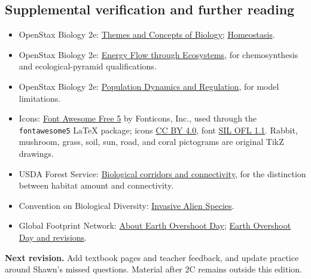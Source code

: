 \documentclass[11pt,letterpaper]{article}
\begin{document}
\subsection*{Supplemental verification and further reading}
\begin{itemize}
\item OpenStax Biology 2e: \href{https://openstax.org/books/biology-2e/pages/1-2-themes-and-concepts-of-biology}{Themes and Concepts of Biology}; \href{https://openstax.org/books/biology-2e/pages/33-3-homeostasis}{Homeostasis}.
\item OpenStax Biology 2e: \href{https://openstax.org/books/biology-2e/pages/46-2-energy-flow-through-ecosystems}{Energy Flow through Ecosystems}, for chemosynthesis and ecological-pyramid qualifications.
\item OpenStax Biology 2e: \href{https://openstax.org/books/biology-2e/pages/45-4-population-dynamics-and-regulation}{Population Dynamics and Regulation}, for model limitations.
\item Icons: \href{https://fontawesome.com/}{Font Awesome Free 5} by Fonticons, Inc., used through the \texttt{fontawesome5} LaTeX package; icons \href{https://creativecommons.org/licenses/by/4.0/}{CC BY 4.0}, font \href{https://scripts.sil.org/OFL}{SIL OFL 1.1}. Rabbit, mushroom, grass, soil, sun, road, and coral pictograms are original TikZ drawings.
\item USDA Forest Service: \href{https://research.fs.usda.gov/treesearch/52660}{Biological corridors and connectivity}, for the distinction between habitat amount and connectivity.
\item Convention on Biological Diversity: \href{https://www.cbd.int/invasive}{Invasive Alien Species}.
\item Global Footprint Network: \href{https://overshoot.footprintnetwork.org/about-earth-overshoot-day/}{About Earth Overshoot Day}; \href{https://footprintnetwork.org/our-work/earth-overshoot-day/}{Earth Overshoot Day and revisions}.
\end{itemize}
\textbf{Next revision.} Add textbook pages and teacher feedback, and update practice around Shawn's missed questions. Material after 2C remains outside this edition.
\end{document}
